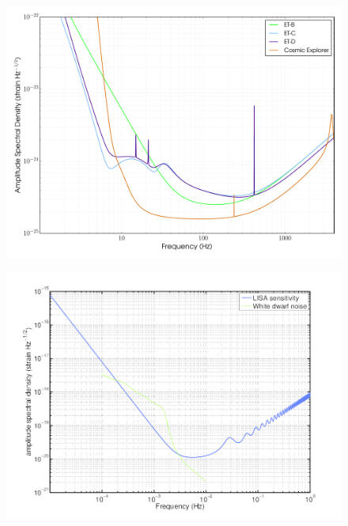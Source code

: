 \documentclass{article}
\begin{document}
\begin{figure}[]
\begin{center}
\includegraphics[width=1\columnwidth]{./figures/etcurve/etcurve}
\caption{ \protect}
\end{center}
\end{figure}



\begin{figure}[]
\begin{center}
\includegraphics[width=1\columnwidth]{./figures/lisacurve/lisacurve}
\caption{ \protect}
\end{center}
\end{figure}
\end{document}
